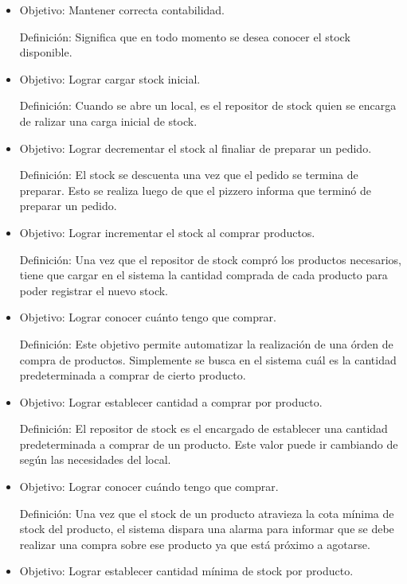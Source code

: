 \documentclass[a4paper,11pt] {article}
\begin{document}
\begin{itemize}
\item
Objetivo: Mantener correcta contabilidad.

Definici\'on: Significa que en todo momento se desea conocer el stock disponible.

\item
Objetivo: Lograr cargar stock inicial.

Definici\'on: Cuando se abre un local, es el repositor de stock quien se encarga de ralizar una carga inicial de stock.

\item
Objetivo: Lograr decrementar el stock al finaliar de preparar un pedido.

Definici\'on: El stock se descuenta una vez que el pedido se termina de preparar. Esto se realiza luego de que el pizzero informa que termin\'o de preparar un pedido.

\item
Objetivo: Lograr incrementar el stock al comprar productos.

Definici\'on: Una vez que el repositor de stock compr\'o los productos necesarios, tiene que cargar en el sistema la cantidad comprada de cada producto para poder registrar el nuevo stock.

\item
Objetivo: Lograr conocer cu\'anto tengo que comprar.

Definici\'on: Este objetivo permite automatizar la realizaci\'on de una \'orden de compra de productos. Simplemente se busca en el sistema cu\'al es la cantidad predeterminada a comprar de cierto producto.

\item
Objetivo: Lograr establecer cantidad a comprar por producto.

Definici\'on: El repositor de stock es el encargado de establecer una cantidad predeterminada a comprar de un producto. Este valor puede ir cambiando de seg\'un las necesidades del local.

\item
Objetivo: Lograr conocer cu\'ando tengo que comprar.

Definici\'on: Una vez que el stock de un producto atravieza la cota m\'inima de stock del producto, el sistema dispara una alarma para informar que se debe realizar una compra sobre ese producto ya que est\'a pr\'oximo a agotarse.

\item
Objetivo: Lograr establecer cantidad m\'inima de stock por producto.


\end{itemize}
\end{document}
